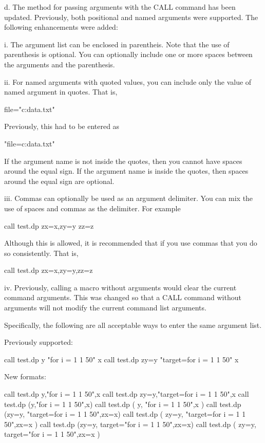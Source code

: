     d. The method for passing arguments with the CALL command has been
       updated.  Previously, both positional and named arguments were
       supported.  The following enhancements were added:

           i. The argument list can be enclosed in parentheis.  Note that
              the use of parenthesis is optional.  You can optionally
              include one or more spaces between the arguments and the
              parenthesis.

          ii. For named arguments with quoted values, you can include
              only the value of named argument in quotes.  That is,

                  file="c:\my data\test.txt"

              Previously, this had to be entered as

                  "file=c:\my data\test.txt"


              If the argument name is not inside the quotes, then you
              cannot have spaces around the equal sign.  If the argument
              name is inside the quotes, then spaces around the equal sign
              are optional.

         iii. Commas can optionally be used as an argument delimiter.  You
              can mix the use of spaces and commas as the delimiter.  For
              example

                   call test.dp  zx=x,zy=y  zz=z

              Although this is allowed, it is recommended that if you use
              commas that you do so consistently.  That is,

                   call test.dp  zx=x,zy=y,zz=z

          iv. Previously, calling a macro without arguments would clear
              the current command arguments.  This was changed so that
              a CALL command without arguments will not modify the current
              command list arguments.

       Specifically, the following are all acceptable ways to enter the
       same argument list.

           Previously supported:

              call test.dp  y "for i = 1 1 50" x
              call test.dp  zy=y "target=for i = 1 1 50" x

           New formats:

              call test.dp  y,"for i = 1 1 50",x
              call test.dp  zy=y,"target=for i = 1 1 50",x
              call test.dp  (y,"for i = 1 1 50",x)
              call test.dp  ( y, "for i = 1 1 50",x )
              call test.dp  (zy=y, "target=for i = 1 1 50",zx=x)
              call test.dp  ( zy=y, "target=for i = 1 1 50",zx=x )
              call test.dp  (zy=y, target="for i = 1 1 50",zx=x)
              call test.dp  ( zy=y, target="for i = 1 1 50",zx=x )


